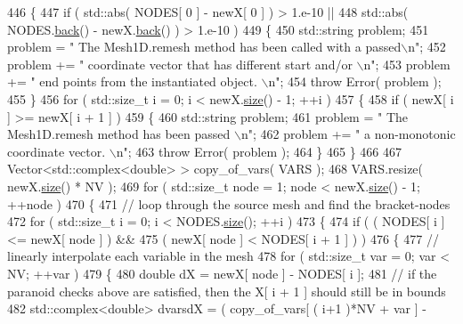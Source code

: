 \begin{DoxyCode}
446   \{
447     \textcolor{keywordflow}{if} ( std::abs( NODES[ 0 ] - newX[ 0 ] ) > 1.e-10 ||
448          std::abs( NODES.\hyperlink{classLuna_1_1Vector_add6be56568d90c49e5f616e334275786}{back}() - newX.\hyperlink{classLuna_1_1Vector_add6be56568d90c49e5f616e334275786}{back}() ) > 1.e-10 )
449     \{
450       std::string problem;
451       problem = \textcolor{stringliteral}{" The Mesh1D.remesh method has been called with a passed\(\backslash\)n"};
452       problem += \textcolor{stringliteral}{" coordinate vector that has different start and/or \(\backslash\)n"};
453       problem += \textcolor{stringliteral}{" end points from the instantiated object. \(\backslash\)n"};
454       \textcolor{keywordflow}{throw} Error( problem );
455     \}
456     \textcolor{keywordflow}{for} ( std::size\_t i = 0; i < newX.\hyperlink{classLuna_1_1Vector_ac9b6ed7a0df401728f27c193fbc8f4d8}{size}() - 1; ++i )
457     \{
458       \textcolor{keywordflow}{if} ( newX[ i ] >= newX[ i + 1 ] )
459       \{
460         std::string problem;
461         problem = \textcolor{stringliteral}{" The Mesh1D.remesh method has been passed \(\backslash\)n"};
462         problem += \textcolor{stringliteral}{" a non-monotonic coordinate vector. \(\backslash\)n"};
463         \textcolor{keywordflow}{throw} Error( problem );
464       \}
465     \}
466 
467     Vector<std::complex<double> > copy\_of\_vars( VARS );
468     VARS.resize( newX.\hyperlink{classLuna_1_1Vector_ac9b6ed7a0df401728f27c193fbc8f4d8}{size}() * NV );
469     \textcolor{keywordflow}{for} ( std::size\_t node = 1; node < newX.\hyperlink{classLuna_1_1Vector_ac9b6ed7a0df401728f27c193fbc8f4d8}{size}() - 1; ++node )
470     \{
471       \textcolor{comment}{// loop through the source mesh and find the bracket-nodes}
472       \textcolor{keywordflow}{for} ( std::size\_t i = 0; i < NODES.\hyperlink{classLuna_1_1Vector_ac9b6ed7a0df401728f27c193fbc8f4d8}{size}(); ++i )
473       \{
474         \textcolor{keywordflow}{if} ( ( NODES[ i ] <= newX[ node ] ) &&
475              ( newX[ node ] < NODES[ i + 1 ] ) )
476          \{
477           \textcolor{comment}{// linearly interpolate each variable in the mesh}
478           \textcolor{keywordflow}{for} ( std::size\_t var = 0; var < NV; ++var )
479           \{
480             \textcolor{keywordtype}{double} dX = newX[ node ] - NODES[ i ];
481             \textcolor{comment}{// if the paranoid checks above are satisfied, then the X[ i + 1 ] should still be in bounds}
482             std::complex<double> dvarsdX = ( copy\_of\_vars[ ( i+1 )*NV + var ] -

\end{DoxyCode}
